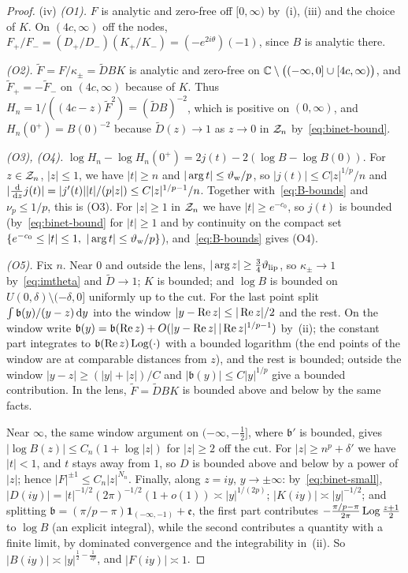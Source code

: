 \begin{proof}
(iv) \emph{(O1).} $F$ is analytic and zero-free off $[0,\infty)$ by~(i), (iii) and the choice of $K$. On
$(4c,\infty)$ off the nodes, $F_+/F_-=(D_+/D_-)(K_+/K_-)=(-e^{2i\theta})(-1)$, since $B$ is analytic there.

\emph{(O2).} $\tilde F=F/\kappa_\pm=\tilde DBK$ is analytic and zero-free on $\mathbb{C}\setminus\bigl((-\infty,0]\cup[4c,\infty)\bigr)$,
and $\tilde F_+=-\tilde F_-$ on $(4c,\infty)$ because of $K$. Thus $H_n=1/((4c-z)\tilde F^2)=(\tilde DB)^{-2}$, which is
positive on $(0,\infty)$, and $H_n(0^+)=B(0)^{-2}$ because $\tilde D(z)\to1$ as $z\to0$ in $\mathcal{Z}_n$ by~\eqref{eq:binet-bound}.

\emph{(O3), (O4).} $\log H_n-\log H_n(0^+)=2j(t)-2(\log B-\log B(0))$. For $z\in\mathcal{Z}_n$, $|z|\le1$, we have $|t|\ge n$ and
$|\arg t|\le\vartheta_{\mathrm{w}}/p$, so $|j(t)|\le C|z|^{1/p}/n$ and $|\frac{\,\mathrm{d}}{\,\mathrm{d} z}j(t)|=|j'(t)||t|/(p|z|)\le C|z|^{1/p-1}/n$.
Together with~\eqref{eq:B-bounds} and $\nu_p\le1/p$, this is (O3). For $|z|\ge1$ in $\mathcal{Z}_n$ we have $|t|\ge e^{-c_0}$, so
$j(t)$ is bounded (by~\eqref{eq:binet-bound} for $|t|\ge1$ and by continuity on the compact set
$\{e^{-c_0}\le|t|\le1,\ |\arg t|\le\vartheta_{\mathrm{w}}/p\}$), and~\eqref{eq:B-bounds} gives (O4).

\emph{(O5).} Fix $n$. Near $0$ and outside the lens, $|\arg z|\ge\frac34\vartheta_{\mathrm{lip}}$, so $\kappa_\pm\to1$ by~\eqref{eq:imtheta}
and $\tilde D\to1$; $K$ is bounded; and $\log B$ is bounded on $U(0,\delta)\setminus(-\delta,0]$ uniformly up to the cut.
For the last point split $\int\mathfrak b(y)/(y-z)\,\mathrm{d} y$ into the window $|y-\operatorname{Re} z|\le|\operatorname{Re} z|/2$ and the rest. On the
window write $\mathfrak b(y)=\mathfrak b(\operatorname{Re} z)+O(|y-\operatorname{Re} z|\,|\operatorname{Re} z|^{1/p-1})$ by~(ii); the constant part integrates to
$\mathfrak b(\operatorname{Re} z)\operatorname{Log}(\cdot)$ with a bounded logarithm (the end points of the window are at comparable distances from
$z$), and the rest is bounded; outside the window $|y-z|\ge(|y|+|z|)/C$ and $|\mathfrak b(y)|\le C|y|^{1/p}$ give a
bounded contribution. In the lens, $\tilde F=\tilde DBK$ is bounded above and below by the same facts.

Near $\infty$, the same window argument on $(-\infty,-\frac12]$, where $\mathfrak b'$ is bounded, gives
$|\log B(z)|\le C_n(1+\log|z|)$ for $|z|\ge2$ off the cut. For $|z|\ge n^p+\delta'$ we have $|t|<1$, and $t$ stays away from
$1$, so $D$ is bounded above and below by a power of $|z|$; hence $|F|^{\pm1}\le C_n|z|^{N_n}$. Finally, along $z=iy$,
$y\to\pm\infty$: by~\eqref{eq:binet-small}, $|D(iy)|=|t|^{-1/2}(2\pi)^{-1/2}(1+o(1))\asymp|y|^{1/(2p)}$; $|K(iy)|\asymp|y|^{-1/2}$;
and splitting $\mathfrak b=(\pi/p-\pi)\mathbf 1_{(-\infty,-1)}+\mathfrak e$, the first part contributes
$-\frac{\pi/p-\pi}{2\pi}\operatorname{Log}\frac{z+1}{2}$ to $\log B$ (an explicit integral), while the second contributes a quantity with
a finite limit, by dominated convergence and the integrability in~(ii). So $|B(iy)|\asymp|y|^{\frac12-\frac1{2p}}$, and
$|F(iy)|\asymp1$.
\end{proof}

